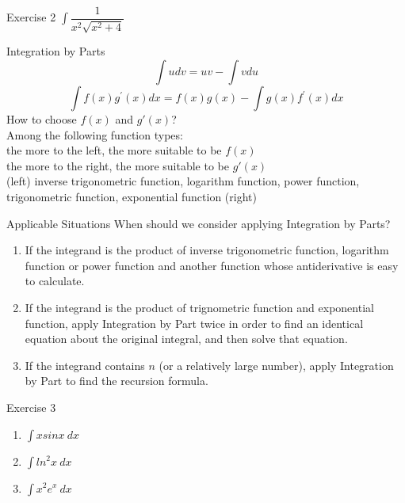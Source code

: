 \documentclass{beamer}
\begin{document}
\begin{frame}{Exercise 2}
    $\int\dfrac{1}{x^2\sqrt{x^2+4}}$
\end{frame}
\begin{frame}{Integration by Parts}
$$
\int u d v=u v-\int v d u
$$
$$
\int f(x) g^{\prime}(x) d x=f(x) g(x)-\int g(x) f^{\prime}(x) d x
$$
How to choose $f(x)$ and $g'(x)$?\\
\bigskip
Among the following function types:\\
the more to the left, the more suitable to be $f(x)$\\
the more to the right, the more suitable to be $g'(x)$\\
\bigskip
\alert{(left)} inverse trigonometric function, logarithm function, power function, trigonometric function, exponential function \alert{(right)}
\end{frame}
\begin{frame}{Applicable Situations}
When should we consider applying Integration by Parts?
\begin{enumerate}
\item If the integrand is the product of \alert{inverse trigonometric function, logarithm function or power function} and another function \alert{whose antiderivative is easy to calculate}.
\item If the integrand is the product of \alert{trignometric function and exponential function}, apply Integration by Part twice in order to find an identical equation about the original integral, and then solve that equation.
\item If the integrand contains $n$ (or a relatively large number), apply Integration by Part to \alert{find the recursion formula}. 
\end{enumerate}
\end{frame}

\begin{frame}{Exercise 3}
    \begin{enumerate}
        \item $\int xsinx\ dx$
        \bigskip
        \item $\int ln^2x\ dx$
        \bigskip
        \item $\int x^2e^x\ dx$
    \end{enumerate}
\end{frame}

\end{document}
